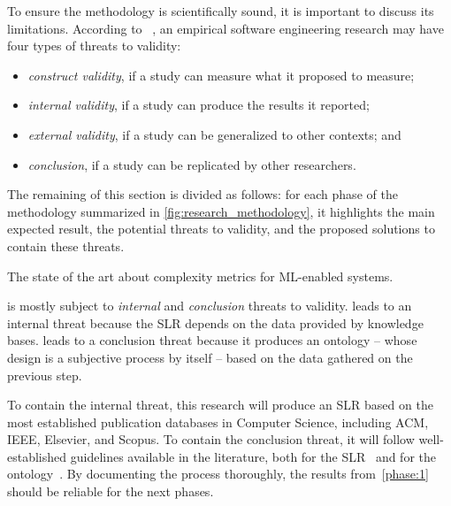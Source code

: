   To ensure the methodology is scientifically sound, it is important to discuss
  its limitations. According to \citeauthor{Easterbrook2008SelectingEngineering}%
  ~\parencite{Easterbrook2008SelectingEngineering}, an empirical software
  engineering research may have four types of threats to validity:
  \begin{itemize}
    \item \emph{construct validity},
          if a study can measure what it proposed to measure;
          \label{it:threat_construct_validity}
    \item \emph{internal validity},
          if a study can produce the results it reported;
          \label{it:threat_internal_validity}
    \item \emph{external validity},
          if a study can be generalized to other contexts; and
          \label{it:threat_external_validity}
    \item \emph{conclusion},
          if a study can be replicated by other researchers.
          \label{it:threat_conclusion}
  \end{itemize}

  The remaining of this section is divided as follows: for each phase of the
  methodology summarized in \cref{fig:research_methodology}, it highlights the
  main expected result, the potential threats to validity, and the proposed
  solutions to contain these threats.

  \begin{expectedresult}
    The state of the art about complexity metrics for ML-enabled systems.
  \end{expectedresult}

   is mostly subject to \emph{internal} and \emph{conclusion}
  threats to validity.  leads to an internal threat because
  the SLR depends on the data provided by knowledge bases. 
  leads to a conclusion threat because it produces an ontology -- whose
  design is a subjective process by itself -- based on the data gathered
  on the previous step.

  To contain the internal threat, this research will produce an SLR
  based on the most established publication databases in Computer Science,
  including ACM, IEEE, Elsevier, and Scopus. To contain the conclusion threat,
  it will follow well-established guidelines available in the literature,
  both for the SLR~\parencite{Kitchenham2012SystematicEngineering} and for
  the ontology~\parencite{NoyOntologyOntology}. By documenting the process
  thoroughly, the results from~\cref{phase:1} should be reliable for the
  next phases.

